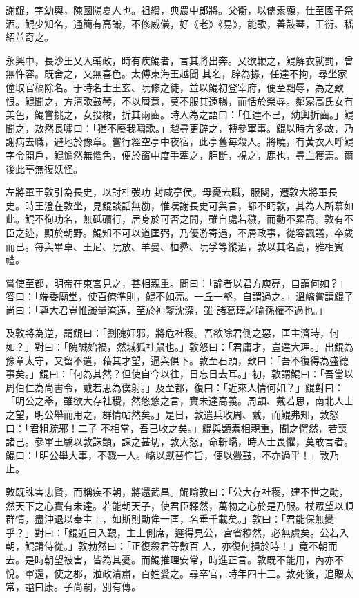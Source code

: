 \begin{pinyinscope}
 謝鯤，字幼輿，陳國陽夏人也。祖纘，典農中郎將。父衡，以儒素顯，仕至國子祭酒。鯤少知名，通簡有高識，不修威儀，好《老》《易》，能歌，善鼓琴，王衍、嵇紹並奇之。



 永興中，長沙王乂入輔政，時有疾鯤者，言其將出奔。乂欲鞭之，鯤解衣就罰，曾無忤容。既舍之，又無喜色。太傅東海王越聞
 其名，辟為掾，任達不拘，尋坐家僮取官稿除名。于時名士王玄、阮修之徒，並以鯤初登宰府，便至黜辱，為之歎恨。鯤聞之，方清歌鼓琴，不以屑意，莫不服其遠暢，而恬於榮辱。鄰家高氏女有美色，鯤嘗挑之，女投梭，折其兩齒。時人為之語曰：「任達不已，幼輿折齒。」鯤聞之，敖然長嘯曰：「猶不廢我嘯歌。」越尋更辟之，轉參軍事。鯤以時方多故，乃謝病去職，避地於豫章。嘗行經空亭中夜宿，此亭舊每殺人。將曉，有黃衣人呼鯤字令開戶，鯤憺然無懼色，便於窗中度手牽之，胛斷，視之，鹿也，尋血獲焉。爾後此亭無復妖怪。



 左將軍王敦引為長史，以討杜弢功
 封咸亭侯。母憂去職，服闋，遷敦大將軍長史。時王澄在敦坐，見鯤談話無勌，惟嘆謝長史可與言，都不眄敦，其為人所慕如此。鯤不徇功名，無砥礪行，居身於可否之間，雖自處若穢，而動不累高。敦有不臣之迹，顯於朝野。鯤知不可以道匡弼，乃優游寄遇，不屑政事，從容諷議，卒歲而已。每與畢卓、王尼、阮放、羊曼、桓彞、阮孚等縱酒，敦以其名高，雅相賓禮。



 嘗使至都，明帝在東宮見之，甚相親重。問曰：「論者以君方庾亮，自謂何如？」答曰：「端委廟堂，使百僚準則，鯤不如亮。一丘一壑，自謂過之。」溫嶠嘗謂鯤子尚曰：「尊大君豈惟識量淹遠，至於神鑒沈深，雖
 諸葛瑾之喻孫權不過也。」



 及敦將為逆，謂鯤曰：「劉隗奸邪，將危社稷。吾欲除君側之惡，匡主濟時，何如？」對曰：「隗誠始禍，然城狐社鼠也。」敦怒曰：「君庸才，豈達大理。」出鯤為豫章太守，又留不遣，藉其才望，逼與俱下。敦至石頭，歎曰：「吾不復得為盛德事矣。」鯤曰：「何為其然？但使自今以往，日忘日去耳。」初，敦謂鯤曰：「吾當以周伯仁為尚書令，戴若思為僕射。」及至都，復曰：「近來人情何如？」鯤對曰：「明公之舉，雖欲大存社稷，然悠悠之言，實未達高義。周顗、戴若思，南北人士之望，明公舉而用之，群情帖然矣。」是日，敦遣兵收周、戴，而鯤弗知，敦怒曰：「君粗疏邪！二子
 不相當，吾已收之矣。」鯤與顗素相親重，聞之愕然，若喪諸己。參軍王驕以敦誅顗，諫之甚切，敦大怒，命斬嶠，時人士畏懼，莫敢言者。鯤曰：「明公舉大事，不戮一人。嶠以獻替忤旨，便以釁鼓，不亦過乎！」敦乃止。



 敦既誅害忠賢，而稱疾不朝，將還武昌。鯤喻敦曰：「公大存社稷，建不世之勛，然天下之心實有未達。若能朝天子，使君臣釋然，萬物之心於是乃服。杖眾望以順群情，盡沖退以奉主上，如斯則勛侔一匡，名垂千載矣。」敦曰：「君能保無變乎？」對曰：「鯤近日入覲，主上側席，遲得見公，宮省穆然，必無虞矣。公若入朝，鯤請侍從。」敦勃然曰：「正復殺君等數百
 人，亦復何損於時！」竟不朝而去。是時朝望被害，皆為其憂。而鯤推理安常，時進正言。敦既不能用，內亦不悅。軍還，使之郡，涖政清肅，百姓愛之。尋卒官，時年四十三。敦死後，追贈太常，謚曰康。子尚嗣，別有傳。




\end{pinyinscope}
